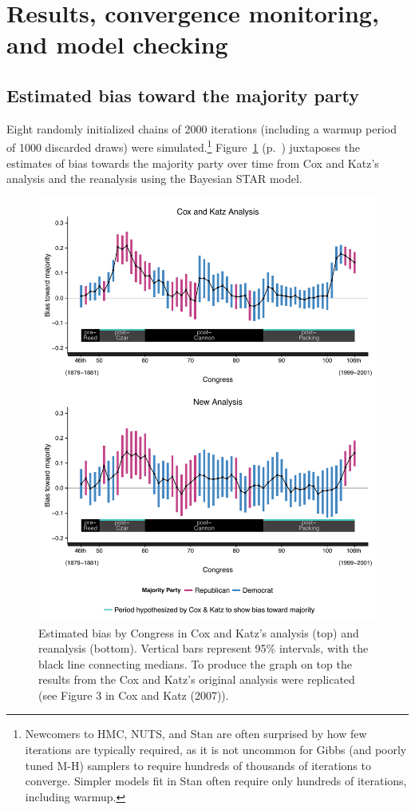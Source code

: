 \section{Results, convergence monitoring, and model checking}
\label{results_convergence_checking}

\subsection[Estimates]{Estimated bias toward the majority party}
\label{results}

Eight randomly initialized chains of 2000 iterations (including a warmup period of 1000 discarded draws) were simulated.\footnote{Newcomers to HMC, NUTS, and Stan are often surprised by how few iterations are typically required, as it is not uncommon for Gibbs (and poorly tuned M-H) samplers to require hundreds of thousands of iterations to converge. Simpler models fit in Stan often require only hundreds of iterations, including warmup.} Figure~\ref{fig:ck_bias} (p.~\pageref{fig:ck_bias}) juxtaposes the estimates of bias towards the majority party over time from Cox and Katz's analysis and the reanalysis using the Bayesian STAR model.

\begin{figure}
\centering
\includegraphics[scale=0.75]{sections/figs/ck_replication}
\caption{Estimated bias by Congress in Cox and Katz's analysis (top) and reanalysis (bottom). Vertical bars represent 95\%  intervals, with the black line connecting medians. To produce the graph on top the results from the Cox and Katz's original analysis were replicated (see Figure 3 in Cox and Katz (2007)).}
\label{fig:ck_bias}
\end{figure}

